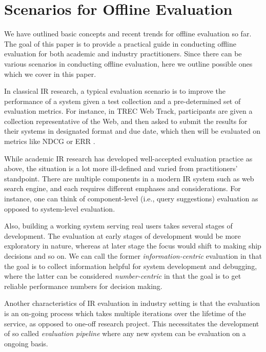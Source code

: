 \documentclass[openany]{now} %
\newcommand{\authornote}[3]{\marginpar{\tiny\color{#1}#2: #3}{\color{#1}{$\star$}}}
\newcommand{\emine}[1]{\authornote{green}{Emine}{#1}}
\begin{document}

\section{Scenarios for Offline Evaluation}

We have outlined basic concepts and recent trends for offline evaluation so far. The goal of this paper is to provide a practical guide in conducting offline evaluation for both academic and industry practitioners. Since there can be various scenarios in conducting offline evaluation, here we outline possible ones which we cover in this paper.

In classical IR research, a typical evaluation scenario is to improve the performance of a system given a test collection and a pre-determined set of evaluation metrics. For instance, in TREC Web Track, participants are given a collection representative of the Web, and then asked to submit the results for their systems in designated format and due date, which then will be evaluated on metrics like NDCG \cite{Jarvelin:2002} or ERR \cite{ChapelleMZG09}.

While academic IR research has developed well-accepted evaluation practice as above, the situation is a lot more ill-defined and varied from practitioners' standpoint. There are multiple components in a modern IR system such as web search engine, and each requires different emphases and considerations. For instance, one can think of component-level (i.e., query suggestions) evaluation as opposed to system-level evaluation. 

Also, building a working system serving real users takes several stages of development. The evaluation at early stages of development would be more exploratory in nature, whereas at later stage the focus would shift to making ship decisions and so on. We can call the former \textit{information-centric} evaluation in that the goal is to collect information helpful for system development and debugging, where the latter can be considered \textit{number-centric} in that the goal is to get reliable performance numbers for decision making.

Another characteristics of IR evaluation in industry setting is that the evaluation is an on-going process which takes multiple iterations over the lifetime of the service, as opposed to one-off research project. This necessitates the development of so called \textit{evaluation pipeline} where any new system can be evaluation on a ongoing basis.  
\end{document}
